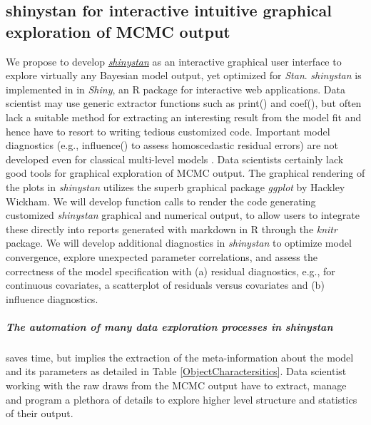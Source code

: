 \documentclass[11pt,notitlepage]{article}
\begin{document}
\subsection*{shinystan for interactive intuitive graphical exploration of MCMC output}
We propose to develop \href{http://andrewgelman.com/2015/03/02/introducing-shinystan/}
{\textit{shinystan}} \cite{GabryISCB2015,shinystan} as an interactive graphical user interface to explore virtually any Bayesian model output, 
yet optimized for \textit{Stan}. \textit{shinystan} is implemented in in \textit{Shiny}, an R package for interactive web applications.
Data scientist may use generic extractor functions such as print() and coef(), but often lack a suitable 
method for extracting an interesting result from the model fit and hence have to resort to 
writing tedious customized code. Important model diagnostics (e.g., influence() to assess  homoscedastic residual errors) 
are not developed even for classical multi-level models \cite{Galecki2013linear}. Data scientists certainly lack 
good tools for graphical exploration of MCMC output. The graphical rendering of the plots in \textit{shinystan} 
utilizes the superb graphical package \textit{ggplot} by Hackley Wickham. 
We will develop function calls to render the code generating customized \textit{shinystan} graphical and numerical output, to allow users to integrate these directly into reports generated with markdown in R through the \textit{knitr} package. We will develop additional diagnostics in \textit{shinystan} to optimize model convergence, explore unexpected parameter 
correlations, and assess the correctness of the model specification with (a) residual diagnostics, e.g., for continuous 
covariates, a scatterplot of residuals versus covariates and (b) influence diagnostics.

\subparagraph{The automation of many data exploration processes in \textit{shinystan}} saves time, 
but implies the extraction of the meta-information about the model and 
its parameters as detailed in Table \ref{ObjectCharactersitics}. Data scientist working with the raw draws from the MCMC output 
have to extract, manage and program a plethora of details to explore higher level structure and statistics of their output. 
\end{document}
